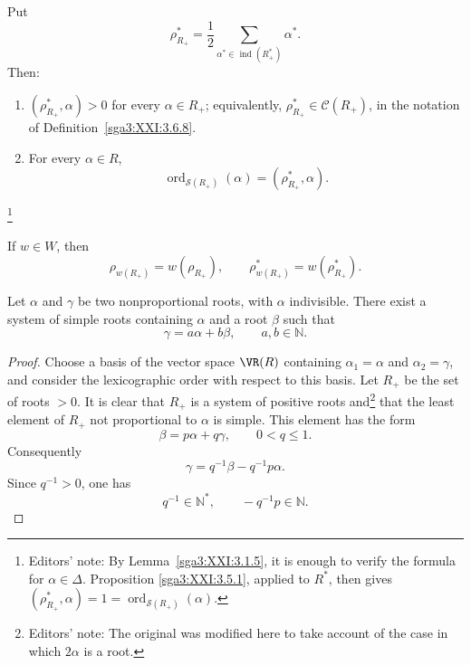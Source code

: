 \begin{corollary}\label{sga3:XXI:3.5.2}
Put
\[
 \rho_{R_+}^\ast
   =\frac12
     \sum_{\alpha^\ast\in\operatorname{ind}(R_+^\ast)}
     \alpha^\ast.
\]
Then:
\begin{enumerate}
\item[(i)] \((\rho_{R_+}^\ast,\alpha)>0\) for every
  \(\alpha\in R_+\); equivalently,
  \(\rho_{R_+}^\ast\in\mathcal{C}(R_+)\), in the notation of
  Definition~\ref{sga3:XXI:3.6.8}.
\item[(ii)] For every \(\alpha\in R\),
  \[
   \operatorname{ord}_{\mathscr{S}(R_+)}(\alpha)
      =(\rho_{R_+}^\ast,\alpha).
  \]
\end{enumerate}
\footnote{Editors' note: By Lemma~\ref{sga3:XXI:3.1.5}, it is enough
to verify the formula for \(\alpha\in\Delta\). Proposition
\ref{sga3:XXI:3.5.1}, applied to \(R^\ast\), then gives
\((\rho_{R_+}^\ast,\alpha)=1
=\operatorname{ord}_{\mathscr{S}(R_+)}(\alpha)\).}
\end{corollary}

\begin{remark}\label{sga3:XXI:3.5.3}
If \(w\in W\), then
\[
 \rho_{w(R_+)}=w(\rho_{R_+}),
 \qquad
 \rho_{w(R_+)}^\ast=w(\rho_{R_+}^\ast).
\]
\end{remark}

\begin{proposition}\label{sga3:XXI:3.5.4}
Let \(\alpha\) and \(\gamma\) be two nonproportional roots, with
\(\alpha\) indivisible. There exist a system of simple roots
containing \(\alpha\) and a root \(\beta\) such that
\[
 \gamma=a\alpha+b\beta,
 \qquad a,b\in\mathbb{N}.
\]
\end{proposition}

\begin{proof}
Choose a basis of the vector space \(\VR(R)\) containing
\(\alpha_1=\alpha\) and \(\alpha_2=\gamma\), and consider the
lexicographic order with respect to this basis. Let \(R_+\) be the set
of roots \(>0\). It is clear that \(R_+\) is a system of positive
roots and\footnote{Editors' note: The original was modified here to
take account of the case in which \(2\alpha\) is a root.} that the
least element of \(R_+\) not proportional to \(\alpha\) is simple.
This element has the form
\[
 \beta=p\alpha+q\gamma,
 \qquad 0<q\le1.
\]
Consequently
\[
 \gamma=q^{-1}\beta-q^{-1}p\alpha.
\]
Since \(q^{-1}>0\), one has
\[
 q^{-1}\in\mathbb{N}^{\ast},
 \qquad
 -q^{-1}p\in\mathbb{N}.
\]
\end{proof}


